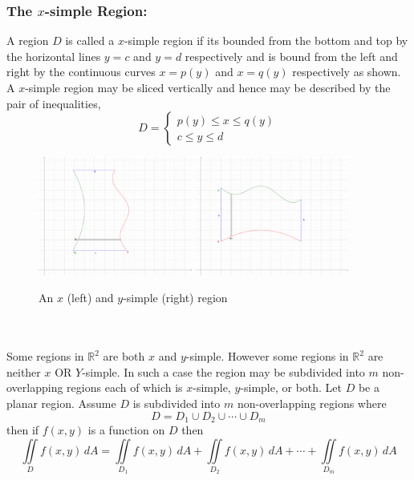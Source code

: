 \documentclass[14pt]{article}
\begin{document}
    \subsubsection{The $x$-simple Region:}
    A region $D$ is called a $x$-simple region if its bounded from the bottom and top by the horizontal lines $y=c$ and $y=d$ respectively and is bound from the left and right by the continuous curves $x=p(y)$ and $x=q(y)$ respectively as shown. A $x$-simple region may be sliced vertically and hence may be described by the pair of inequalities,
    $$D=\left\{\begin{array}{lr}
        p(y)\leq x\leq q(y)\\
        c\leq y \leq d
    \end{array}\right.$$
    \begin{figure}[th!]
        \includegraphics[width=0.45\textwidth]{x-simple.eps}
        \hspace{0.09\textwidth}
        \includegraphics[width=0.45\textwidth]{y-simple.eps}
        \caption{An $x$ (left) and $y$-simple (right) region}
    \end{figure}\\\\
    Some regions in $\mathbb{R}^2$ are both $x$ and $y$-simple. However some regions in $\mathbb{R}^2$ are neither $x$ OR $Y$-simple. In such a case the region may be subdivided into $m$ non-overlapping regions each of which is $x$-simple, $y$-simple, or both. Let $D$ be a planar region. Assume $D$ is subdivided into $m$ non-overlapping regions where
    $$D=D_1\cup D_2\cup\cdots\cup D_m$$
    then if $f(x,y)$ is a function on $D$ then 
    $$\iint\limits_Df(x,y)\, dA=\iint\limits_{D_1}f(x,y)\, dA+\iint\limits_{D_2}f(x,y)\, dA+\cdots+\iint\limits_{D_m}f(x,y)\, dA$$  
\end{document}
